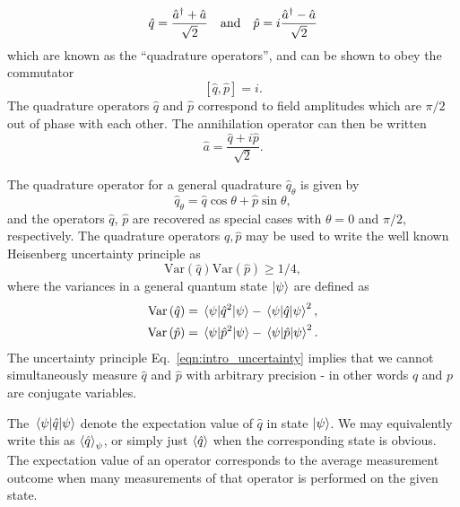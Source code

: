 \begin{equation}\label{eqn:intro_quadrature}
\hat{q} = \frac{\hat{a}^\dagger + \hat{a}}{\sqrt{2}} \qq{and} \hat{p} = i \frac{\hat{a}^\dagger - \hat{a}}{\sqrt{2}}
\end{equation}
which are known as the ``quadrature operators'', and can be shown to obey the commutator
\begin{equation}\label{eqn:intro_quadrature_commutator}
\left[\hat{q}, \hat{p}\right] = i.
\end{equation}
The quadrature operators $\hat{q}$ and $\hat{p}$ correspond to field amplitudes which are $\pi/2$ out of phase with each other. The annihilation operator can then be written
\begin{equation}
\hat{a} = \frac{\hat{q} + i \hat{p}}{\sqrt{2}}.
\end{equation}

\noindent The quadrature operator for a general quadrature $\hat{q}_\theta$ is given by
\begin{equation}
\hat{q}_\theta = \hat{q} \cos\theta  + \hat{p} \sin\theta ,
\end{equation}
and the operators $\hat{q}$, $\hat{p}$ are recovered as special cases with $\theta = 0$ and $\pi/2$, respectively. The quadrature operators $\hat{q}, \hat{p}$ may be used to write the well known Heisenberg uncertainty principle as
\begin{equation}\label{eqn:intro_uncertainty}
\text{Var}\left(\hat{q}\right)\text{Var}\left(\hat{p}\right) \ge 1/4, %
\end{equation} 
where the variances in a general quantum state $\ket{\psi}$ are defined as
\begin{align}
\text{Var}\left(\hat{q}\right) &= \mel{\psi}{\hat{q}^2}{\psi} - \mel{\psi}{\hat{q}}{\psi}^2, \notag \\
\text{Var}\left(\hat{p}\right) &= \mel{\psi}{\hat{p}^2}{\psi} - \mel{\psi}{\hat{p}}{\psi}^2.
\end{align}
The uncertainty principle Eq.~\ref{eqn:intro_uncertainty} implies that we cannot simultaneously measure $\hat{q}$ and $\hat{p}$ with arbitrary precision - in other words $q$ and $p$ are conjugate variables.

The $\mel{\psi}{\hat{q}}{\psi}$ denote the expectation value of $\hat{q}$ in state $\ket{\psi}$. We may equivalently write this as $\ev{\hat{q}}_\psi$, or simply just $\ev{\hat{q}}$ when the corresponding state is obvious. The expectation value of an operator corresponds to the average measurement outcome when many measurements of that operator is performed on the given state.

